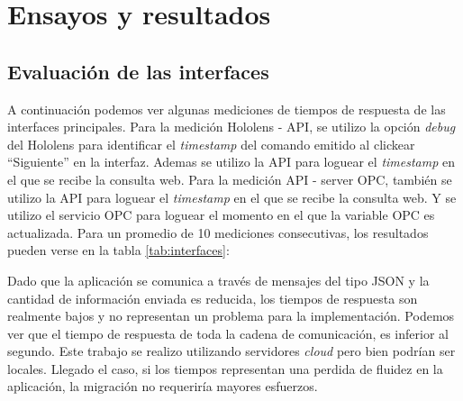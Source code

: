 
\chapter{Ensayos y resultados} %

\label{Chapter4} %


\section{Evaluación de las interfaces}
\label{sec:pruebasHW}

A continuación podemos ver algunas mediciones de tiempos de respuesta de las interfaces principales. Para la medición Hololens - API, se utilizo la opción \textit{debug} del Hololens para identificar el \textit{timestamp} del comando emitido al clickear ``Siguiente'' en la interfaz. Ademas se utilizo la API para loguear el \textit{timestamp} en el que se recibe la consulta web. Para la medición API - server OPC, también se utilizo la API para loguear el \textit{timestamp} en el que se recibe la consulta web. Y se utilizo el servicio OPC para loguear el momento en el que la variable OPC es actualizada. Para un promedio de 10 mediciones consecutivas, los resultados pueden verse en la tabla \ref{tab:interfaces}:

\begin{table}[htpb]
	\centering
	\caption[Tiempos de respuesta]{Tiempos de respuesta promedio}
	\label{tab:interfaces}
\end{table}

Dado que la aplicación se comunica a través de mensajes del tipo JSON y la cantidad de información enviada es reducida, los tiempos de respuesta son realmente bajos y no representan un problema para la implementación. Podemos ver que el tiempo de respuesta de toda la cadena de comunicación, es inferior al segundo. Este trabajo se realizo utilizando servidores \textit{cloud} pero bien podrían ser locales. Llegado el caso, si los tiempos representan una perdida de fluidez en la aplicación, la migración no requeriría mayores esfuerzos. 
